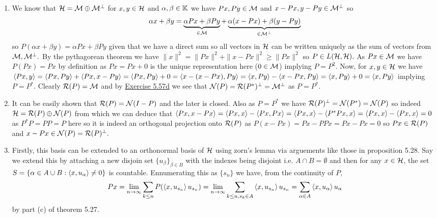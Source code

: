 \documentclass[12pt,a4paper]{article}
\begin{document}
\begin{solution}
    \begin{enumerate}[label=\alph*.]
        \item We know that $\mathcal{H}=\mathcal{M}\oplus\mathcal{M}^\perp$ for $x,y\in\mathcal{H}$ and $\alpha,\beta\in\mathbb{K}$ we have $Px,Py\in\mathcal{M}$ and $x-Px,y-Py\in\mathcal{M}^\perp$ so 
            \[
                \alpha x+\beta y=\underbrace{\alpha Px+\beta Py}_{\in\mathcal{M}}+\underbrace{\alpha(x-Px)+\beta(y-Py)}_{\in\mathcal{M}^\perp}
            \]
            so $P(\alpha x+\beta y)=\alpha Px+\beta Py$ given that we have a direct sum so all vectors in $\mathcal{H}$ can be written uniquely as the sum of vectors from $\mathcal{M},\mathcal{M}^\perp.$ 
            By the pythagorean theorem we have $\|x\|^2=\|Px\|^2+\|x-Px\|^2\geq\|Px\|^2$ so $P\in L(\mathcal{H},\mathcal{H}).$ 
            As $Px\in\mathcal{M}$ we have $P(Px)=Px$ by definition as $Px=Px+0$ is the unique representation here ($0\in\mathcal{M}$) implying $P=P^2.$ 
            Now, for $x,y\in\mathcal{H}$ we have $\left\langle Px,y\right\rangle=\left\langle Px,Py\right\rangle+\left\langle Px,x-Py\right\rangle=\left\langle Px,Py\right\rangle+0=\left\langle x-(x-Px),Py\right\rangle=\left\langle x,Py\right\rangle-\left\langle x-Px,Py\right\rangle=\left\langle x,Py\right\rangle+0=\left\langle x,Py\right\rangle$ implying $P=P^*.$ 
            Clearly $\mathcal{R}(P)=\mathcal{M}$ and by \hyperref[prob:5-57]{Exercise 5.57d} we see that $\mathcal{N}(P)=\mathcal{R}(P^*)^\perp=\mathcal{M}^\perp$ as $P=P^*.$ 
        \item It can be easily shown that $\mathcal{R}(P)=\mathcal{N}(I-P)$ and the later is closed. 
            Also as $P=P^*$ we have $\mathcal{R}(P)^\perp=\mathcal{N}(P^*)=\mathcal{N}(P)$ so indeed $\mathcal{H}=\mathcal{R}(P)\oplus\mathcal{N}(P)$ from which we can deduce that $\left\langle Px,x-Px\right\rangle=\left\langle Px,x\right\rangle-\left\langle Px,Px\right\rangle=\left\langle Px,x\right\rangle-\left\langle P^*Px,x\right\rangle=\left\langle Px,x\right\rangle-\left\langle Px,x\right\rangle=0$ as $P^*P=PP=P$ here so it is indeed an orthogonal projection onto $\mathcal{R}(P)$ as $P(x-Px)=Px-PPx=Px-Px=0$ so $Px\in\mathcal{R}(P)$ and $x-Px\in\mathcal{N}(P)=\mathcal{R}(P)^\perp.$ 
        \item Firstly, this basis can be extended to an orthonormal basis of $\mathcal{H}$ using zorn's lemma via arguements like those in proposition 5.28. 
            Say we extend this by attaching a new disjoin set $\{u_\beta\}_{\beta\in B}$ with the indexes being disjoint i.e. $A\cap B=\emptyset$ and then for any $x\in\mathcal{H}$, the set $S=\{\alpha\in A\cup B:\left\langle x,u_\alpha\right\rangle\neq 0\}$ is countable. 
            Ennumerating this as $\{s_n\}$ we have, from the continuity of $P,$ 
            \[
                Px=\lim_{n\to\infty}\sum_{k\leq n}P(\left\langle x,u_{s_n}\right\rangle u_{s_n})=\lim_{n\to\infty}\sum_{k\leq n,s_k\in A}\left\langle x,u_{s_n}\right\rangle u_{s_n}=\sum_{\alpha\in A}\left\langle x,u_\alpha\right\rangle u_\alpha
            \]
            by part (c) of theorem 5.27. 
    \end{enumerate}
\end{solution}
\end{document}
